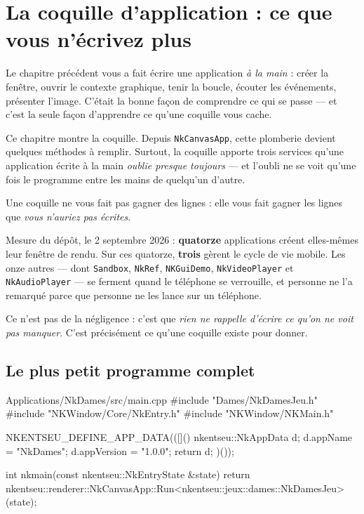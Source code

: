 \chapter{La coquille d'application : ce que vous n'écrivez plus}

Le chapitre précédent vous a fait écrire une application \emph{à la main} :
créer la fenêtre, ouvrir le contexte graphique, tenir la boucle, écouter les
événements, présenter l'image. C'était la bonne façon de comprendre ce qui se
passe --- et c'est la seule façon d'apprendre ce qu'une coquille vous cache.

Ce chapitre montre la coquille. Depuis \texttt{NkCanvasApp}, cette plomberie
devient quelques méthodes à remplir. Surtout, la coquille apporte trois services
qu'une application écrite à la main \emph{oublie presque toujours} --- et l'oubli
ne se voit qu'une fois le programme entre les mains de quelqu'un d'autre.

\begin{nkretenir}
Une coquille ne vous fait pas gagner des lignes : elle vous fait gagner les
lignes que \emph{vous n'auriez pas écrites}.

Mesure du dépôt, le 2 septembre 2026 : \textbf{quatorze} applications créent
elles-mêmes leur fenêtre de rendu. Sur ces quatorze, \textbf{trois} gèrent le
cycle de vie mobile. Les onze autres --- dont \texttt{Sandbox}, \texttt{NkRef},
\texttt{NKGuiDemo}, \texttt{NkVideoPlayer} et \texttt{NkAudioPlayer} --- se
ferment quand le téléphone se verrouille, et personne ne l'a remarqué parce que
personne ne les lance sur un téléphone.

Ce n'est pas de la négligence : c'est que \emph{rien ne rappelle d'écrire ce
qu'on ne voit pas manquer}. C'est précisément ce qu'une coquille existe pour
donner.
\end{nkretenir}

\section{Le plus petit programme complet}

\begin{nkcode}{Applications/NkDames/src/main.cpp}
#include "Dames/NkDamesJeu.h"
#include "NKWindow/Core/NkEntry.h"
#include "NKWindow/NKMain.h"

NKENTSEU_DEFINE_APP_DATA(([]() {
    nkentseu::NkAppData d{};
    d.appName = "NkDames";
    d.appVersion = "1.0.0";
    return d;
})());

int nkmain(const nkentseu::NkEntryState &state) {
    return nkentseu::renderer::NkCanvasApp::Run<nkentseu::jeux::dames::NkDamesJeu>(state);
}
\end{nkcode}

